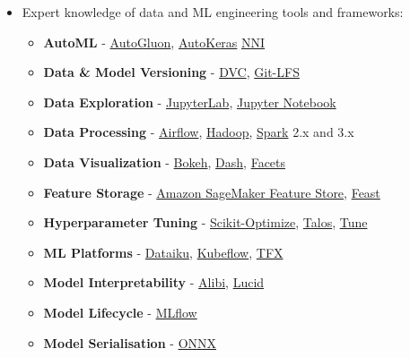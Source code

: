 \documentclass[letterpaper,11pt]{article}
\begin{document}
\begin{itemize}[leftmargin=0.15in, label={}]
    \item Expert knowledge of data and ML engineering tools and frameworks:
    
    \begin{itemize}
        \item \textbf{AutoML} - 
            \href{https://auto.gluon.ai/}{AutoGluon},
            \href{https://autokeras.com/}{AutoKeras}
            \href{https://github.com/Microsoft/nni}{NNI}
        \item \textbf{Data \& Model Versioning} - 
            \href{https://dvc.org/}{DVC}, 
            \href{https://git-lfs.github.com/}{Git-LFS}
        \item \textbf{Data Exploration} - 
            \href{https://jupyterlab.readthedocs.io/en/stable/}{JupyterLab},
            \href{https://jupyter.org/}{Jupyter Notebook}
        \item \textbf{Data Processing} - 
            \href{https://airflow.apache.org/}{Airflow}, 
            \href{https://hadoop.apache.org/}{Hadoop}, 
            \href{https://spark.apache.org/}{Spark} 2.x and 3.x
        \item \textbf{Data Visualization} - 
            \href{https://bokeh.org}{Bokeh}, 
            \href{https://github.com/plotly/dash}{Dash},
            \href{https://github.com/PAIR-code/facets}{Facets}
        \item \textbf{Feature Storage} - 
            \href{https://aws.amazon.com/sagemaker/feature-store/}{Amazon SageMaker Feature Store},
            \href{https://feast.dev/}{Feast}
        \item \textbf{Hyperparameter Tuning} -
            \href{https://github.com/scikit-optimize/scikit-optimize}{Scikit-Optimize},
            \href{https://github.com/autonomio/talos}{Talos},
            \href{https://docs.ray.io/en/latest/tune/index.html}{Tune}
        \item \textbf{ML Platforms} - 
            \href{https://www.dataiku.com/}{Dataiku}, 
            \href{https://www.kubeflow.org/}{Kubeflow}, 
            \href{https://www.tensorflow.org/tfx}{TFX}
        \item \textbf{Model Interpretability} - 
            \href{https://github.com/SeldonIO/alibi}{Alibi},
            \href{https://github.com/tensorflow/lucid}{Lucid} 
        \item \textbf{Model Lifecycle} - 
            \href{https://mlflow.org/}{MLflow}
        \item \textbf{Model Serialisation} - 
            \href{https://onnx.ai/}{ONNX}

\end{itemize}
\end{itemize}
\end{document}
